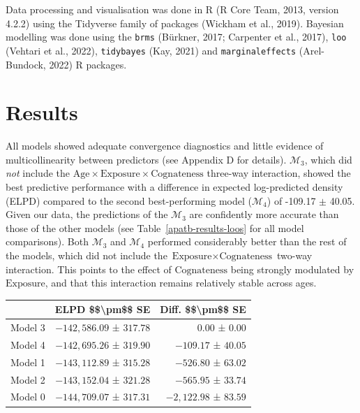 \documentclass[
  man,
  floatsintext,
  colorlinks=true,linkcolor=blue,citecolor=blue,urlcolor=blue,biblatex]{apa7}
\begin{document}
Data processing and visualisation was done in R (R Core Team, 2013,
version 4.2.2) using the Tidyverse family of packages (Wickham et al.,
2019). Bayesian modelling was done using the \texttt{brms} (Bürkner,
2017; Carpenter et al., 2017), \texttt{loo} (Vehtari et al., 2022),
\texttt{tidybayes} (Kay, 2021) and \texttt{marginaleffects}
(Arel-Bundock, 2022) R packages.

\hypertarget{sec-results}{%
\section{Results}\label{sec-results}}

All models showed adequate convergence diagnostics and little evidence
of multicollinearity between predictors (see Appendix D for details).
\(\mathcal{M}_{3}\), which did \emph{not} include the
\(\text{Age} \times \text{Exposure} \times \text{Cognateness}\)
three-way interaction, showed the best predictive performance with a
difference in expected log-predicted density (ELPD) compared to the
second best-performing model (\(\mathcal{M}_{4}\)) of -109.17 \(\pm\)
40.05. Given our data, the predictions of the \(\mathcal{M}_{3}\) are
confidently more accurate than those of the other models (see
Table~\ref{apatb-results-loos} for all model comparisons). Both
\(\mathcal{M}_3\) and \(\mathcal{M}_4\) performed considerably better
than the rest of the models, which did not include the
\(\text{Exposure} \times \text{Cognateness}\) two-way interaction. This
points to the effect of \(\text{Cognateness}\) being strongly modulated
by \(\text{Exposure}\), and that this interaction remains relatively
stable across ages.

\begin{table}
\caption{Bayesian leave-one-out cross validation (LOO-CV).}
\label{apatb-results-loos}

\begin{longtable*}{l|rr}
\toprule
{} & ELPD \$\$\textbackslash{}pm\$\$ SE & Diff. \$\$\textbackslash{}pm\$\$ SE \\ 
\midrule
Model 3 & $-142,586.09$ ± $317.78$ & $0.00$ ± $0.00$ \\ 
Model 4 & $-142,695.26$ ± $319.90$ & $-109.17$ ± $40.05$ \\ 
Model 1 & $-143,112.89$ ± $315.28$ & $-526.80$ ± $63.02$ \\ 
Model 2 & $-143,152.04$ ± $321.28$ & $-565.95$ ± $33.74$ \\ 
Model 0 & $-144,709.07$ ± $317.31$ & $-2,122.98$ ± $83.59$ \\ 
\bottomrule
\end{longtable*}


\end{table}
\end{document}
